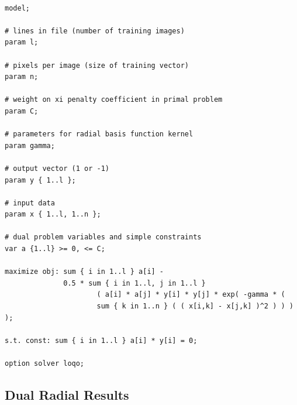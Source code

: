 \documentclass{article}
\begin{document}
\begin{verbatim}

model;

# lines in file (number of training images)
param l;

# pixels per image (size of training vector)
param n;

# weight on xi penalty coefficient in primal problem
param C;

# parameters for radial basis function kernel
param gamma;

# output vector (1 or -1)
param y { 1..l };

# input data
param x { 1..l, 1..n };

# dual problem variables and simple constraints
var a {1..l} >= 0, <= C;

maximize obj: sum { i in 1..l } a[i] -
              0.5 * sum { i in 1..l, j in 1..l }
                      ( a[i] * a[j] * y[i] * y[j] * exp( -gamma * ( 
                      sum { k in 1..n } ( ( x[i,k] - x[j,k] )^2 ) ) ) );

s.t. const: sum { i in 1..l } a[i] * y[i] = 0;

option solver loqo;

\end{verbatim}

\subsection{Dual Radial Results}
\end{document}
